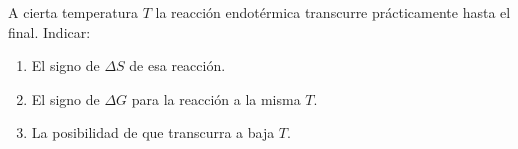 A cierta temperatura $T$ la reacción endotérmica  transcurre prácticamente hasta el final. Indicar:
\begin{enumerate}[label={\alph*)},font={\color{red!50!black}\bfseries}]
    \item El signo de $\Delta S$ de esa reacción.
    \item El signo de $\Delta G$ para la reacción  a la misma $T$.
    \item La posibilidad de que transcurra  a baja $T$.
\end{enumerate}
